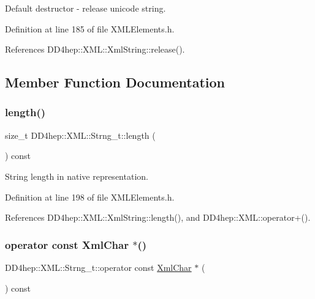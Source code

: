 Default destructor -\/ release unicode string. 



Definition at line 185 of file X\+M\+L\+Elements.\+h.



References D\+D4hep\+::\+X\+M\+L\+::\+Xml\+String\+::release().



\subsection{Member Function Documentation}
\hypertarget{class_d_d4hep_1_1_x_m_l_1_1_strng__t_afac809f38bc57134efc49101e28bad8f}{}\label{class_d_d4hep_1_1_x_m_l_1_1_strng__t_afac809f38bc57134efc49101e28bad8f} 
\subsubsection{\texorpdfstring{length()}{length()}}
{\footnotesize\ttfamily size\+\_\+t D\+D4hep\+::\+X\+M\+L\+::\+Strng\+\_\+t\+::length (\begin{DoxyParamCaption}{ }\end{DoxyParamCaption}) const\hspace{0.3cm}{\ttfamily [inline]}}



String length in native representation. 



Definition at line 198 of file X\+M\+L\+Elements.\+h.



References D\+D4hep\+::\+X\+M\+L\+::\+Xml\+String\+::length(), and D\+D4hep\+::\+X\+M\+L\+::operator+().

\hypertarget{class_d_d4hep_1_1_x_m_l_1_1_strng__t_a879a62db4e9db8fac41eff74fd991334}{}\label{class_d_d4hep_1_1_x_m_l_1_1_strng__t_a879a62db4e9db8fac41eff74fd991334} 
\subsubsection{\texorpdfstring{operator const Xml\+Char $\ast$()}{operator const XmlChar *()}}
{\footnotesize\ttfamily D\+D4hep\+::\+X\+M\+L\+::\+Strng\+\_\+t\+::operator const \hyperlink{namespace_d_d4hep_1_1_x_m_l_a09e5d9cc86ed782f6826dfe0778c1815}{Xml\+Char} $\ast$ (\begin{DoxyParamCaption}{ }\end{DoxyParamCaption}) const\hspace{0.3cm}{\ttfamily [inline]}}



